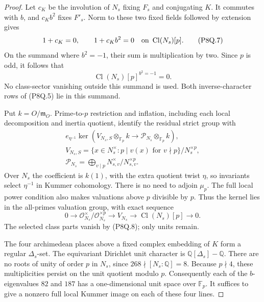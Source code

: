 \begin{proof}
Let $c_K$ be the involution of $N_s$ fixing $F_s$ and
conjugating $K$.
It commutes with $b$, and $c_Kb^2$ fixes $F'_s$.
Norm to these two fixed fields followed by extension gives
\[
         1+c_K=0,\qquad1+c_Kb^2=0
                     \quad\hbox{on }\operatorname{Cl}(N_s)[p].
 \tag{P8Q.7}
\]
On the summand where $b^2=-1$, their sum is multiplication
by two.  Since $p$ is odd, it follows that
\[
                \operatorname{Cl}(N_s)[p]^{b^2=-1}=0.
 \tag{P8Q.8}
\]
No class-sector vanishing outside this summand is used.
Both inverse-character rows of (P8Q.5) lie in this summand.

Put $k=O/\mathfrak m_O$.
Prime-to-$p$ restriction and inflation, including each local
decomposition and inertia quotient, identify the residual
strict group with
\[
 \begin{gathered}
 e_{\eta^{-1}}\ker\left(
 V_{N_s,S}\otimes_{\mathbb F_p}k
       \longrightarrow\mathcal P_{N_s}\otimes_{\mathbb F_p}k\right),\\
 V_{N_s,S}=\{x\in N_s^\times:
      p\mid v(x)\text{ for }v\nmid p\}/N_s^{\times p},\\
 \mathcal P_{N_s}=\bigoplus_{v\mid p}
                          N_{s,v}^{\times}/N_{s,v}^{\times p}.
 \end{gathered}
 \tag{P8Q.9}
\]
Over $N_s$ the coefficient is $k(1)$, with the extra quotient
twist $\eta$, so invariants select $\eta^{-1}$ in Kummer
cohomology.  There is no need to adjoin $\mu_p$.
The full local power condition also makes valuations above
$p$ divisible by $p$.  Thus the kernel lies in the all-primes
valuation group, with exact sequence
\[
 0\longrightarrow\mathcal O_{N_s}^{\times}/\mathcal O_{N_s}^{\times p}
 \longrightarrow V_{N_s}\longrightarrow
                          \operatorname{Cl}(N_s)[p]\longrightarrow0.
 \tag{P8Q.10}
\]
The selected class parts vanish by (P8Q.8); only units remain.

The four archimedean places above a fixed complex embedding
of $K$ form a regular $\Delta_s$-set.
The equivariant Dirichlet unit character is
$\mathbb Q[\Delta_s]-\mathbb Q$.
There are no roots of unity of order $p$ in $N_s$, since
$268\nmid[N_s:\mathbb Q]=8$.
Because $p\nmid4$, these multiplicities persist on the unit
quotient modulo $p$.
Consequently each of the $b$-eigenvalues $82$ and $187$
has a one-dimensional unit space over $\mathbb F_p$.
It suffices to give a nonzero full local Kummer image on
each of these four lines.


\end{proof}

